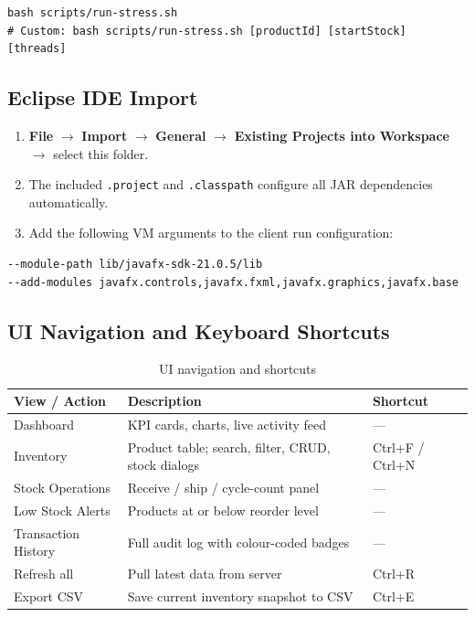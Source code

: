 \documentclass[12pt,a4paper]{article}
\begin{document}
\begin{lstlisting}[style=shell, numbers=none, caption={Step 4 (optional) --- Concurrency stress test}]
bash scripts/run-stress.sh
# Custom: bash scripts/run-stress.sh [productId] [startStock] [threads]
\end{lstlisting}

\subsection{Eclipse IDE Import}

\begin{enumerate}[leftmargin=1.6em]
  \item \textbf{File} $\to$ \textbf{Import} $\to$ \textbf{General} $\to$
        \textbf{Existing Projects into Workspace} $\to$ select this folder.
  \item The included \texttt{.project} and \texttt{.classpath} configure all
        JAR dependencies automatically.
  \item Add the following VM arguments to the client run configuration:
\end{enumerate}

\begin{lstlisting}[style=shell, numbers=none, basicstyle=\ttfamily\small]
--module-path lib/javafx-sdk-21.0.5/lib
--add-modules javafx.controls,javafx.fxml,javafx.graphics,javafx.base
\end{lstlisting}

\subsection{UI Navigation and Keyboard Shortcuts}

\begin{table}[H]
\centering
\begin{tabular}{lll}
\toprule
\textbf{View / Action} & \textbf{Description} & \textbf{Shortcut} \\
\midrule
Dashboard           & KPI cards, charts, live activity feed               & --- \\
Inventory           & Product table; search, filter, CRUD, stock dialogs  & Ctrl+F / Ctrl+N \\
Stock Operations    & Receive / ship / cycle-count panel                  & --- \\
Low Stock Alerts    & Products at or below reorder level                  & --- \\
Transaction History & Full audit log with colour-coded badges             & --- \\
Refresh all         & Pull latest data from server                        & Ctrl+R \\
Export CSV          & Save current inventory snapshot to CSV              & Ctrl+E \\
\bottomrule
\end{tabular}
\caption{UI navigation and shortcuts}
\end{table}
\end{document}
